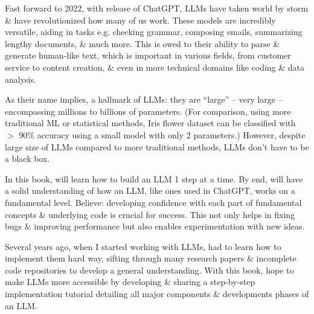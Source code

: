 \documentclass{article}
\begin{document}
\begin{itemize}
	Fast forward to 2022, with release of ChatGPT, LLMs have taken world by storm \& have revolutionized how many of us work. These models are incredibly versatile, aiding in tasks e.g. checking grammar, composing emails, summarizing lengthy documents, \& much more. This is owed to their ability to parse \& generate human-like text, which is important in various fields, from customer service to content creation, \& even in more technical domains like coding \& data analysis.
	
	As their name implies, a hallmark of LLMs: they are ``large'' -- very large -- encompassing millions to billions of parameters. (For comparison, using more traditional ML or statistical methods, Iris flower dataset can be classified with $>$ 90\% accuracy using a small model with only 2 parameters.) However, despite large size of LLMs compared to more traditional methods, LLMs don't have to be a black box.
	
	In this book, will learn how to build an LLM 1 step at a time. By end, will have a solid understanding of how an LLM, like ones used in ChatGPT, works on a fundamental level. Believe: developing confidence with each part of fundamental concepts \& underlying code is crucial for success. This not only helps in fixing bugs \& improving performance but also enables experimentation with new ideas.
	
	Several years ago, when I started working with LLMs, had to learn how to implement them hard way, sifting through many research papers \& incomplete code repositories to develop a general understanding. With this book, hope to make LLMs more accessible by developing \& sharing a step-by-step implementation tutorial detailing all major components \& developments phases of an LLM.
	

\end{itemize}
\end{document}

